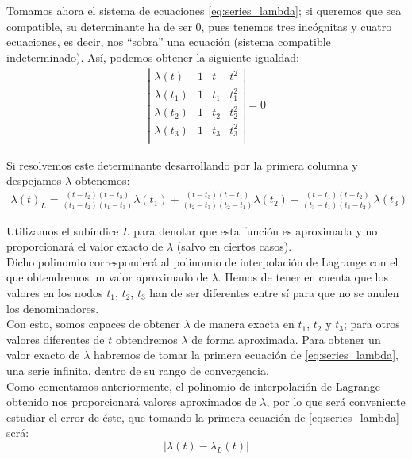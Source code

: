 \documentclass[11pt]{book}
\begin{document}
Tomamos ahora el sistema de ecuaciones \eqref{eq:series_lambda}; si queremos que sea compatible, su determinante ha de ser 0, pues tenemos tres incógnitas y cuatro ecuaciones, es decir, nos ``sobra'' una ecuación (sistema compatible indeterminado). Así, podemos obtener la siguiente igualdad:
\begin{align}
\left|
\begin{array}{cccc}
\lambda(t)   & 1 & t   & t^2  \\
\lambda(t_1) & 1 & t_1 & t^2_1\\
\lambda(t_2) & 1 & t_2 & t^2_2\\
\lambda(t_3) & 1 & t_3 & t^2_3\\
\end{array}
\right|
=0
\label{eq:resultante}
\end{align}

Si resolvemos este determinante desarrollando por la primera columna y despejamos $\lambda$ obtenemos:
\begin{align}
\lambda(t)_L=
\frac{(t-t_2)(t-t_3)}{(t_1-t_2)(t_1-t_3)}\lambda(t_1)
+\frac{(t-t_3)(t-t_1)}{(t_2-t_3)(t_2-t_1)}\lambda(t_2)
+\frac{(t-t_1)(t-t_2)}{(t_3-t_1)(t_3-t_2)}\lambda(t_3)
\label{eq:lambda_value}
\end{align}

Utilizamos el subíndice $L$ para denotar que esta función es aproximada y no proporcionará el valor exacto de $\lambda$ (salvo en ciertos casos).\\

Dicho polinomio corresponderá al polinomio de interpolación de Lagrange con el que obtendremos un valor aproximado de $\lambda$. Hemos de tener en cuenta que los valores en los nodos $t_1$, $t_2$, $t_3$ han de ser diferentes entre sí para que no se anulen los denominadores.\\

Con esto, somos capaces de obtener $\lambda$ de manera exacta en $t_1$, $t_2$ y $t_3$; para otros valores diferentes de $t$ obtendremos $\lambda$ de forma aproximada. Para obtener un valor exacto de $\lambda$ habremos de tomar la primera ecuación de \eqref{eq:series_lambda}, una serie infinita, dentro de su rango de convergencia.\\

Como comentamos anteriormente, el polinomio de interpolación de Lagrange obtenido nos proporcionará valores aproximados de $\lambda$, por lo que será conveniente estudiar el error de éste, que tomando la primera ecuación de \eqref{eq:series_lambda} será:
\[
|\lambda(t)-\lambda_L(t)|
\]
\end{document}

